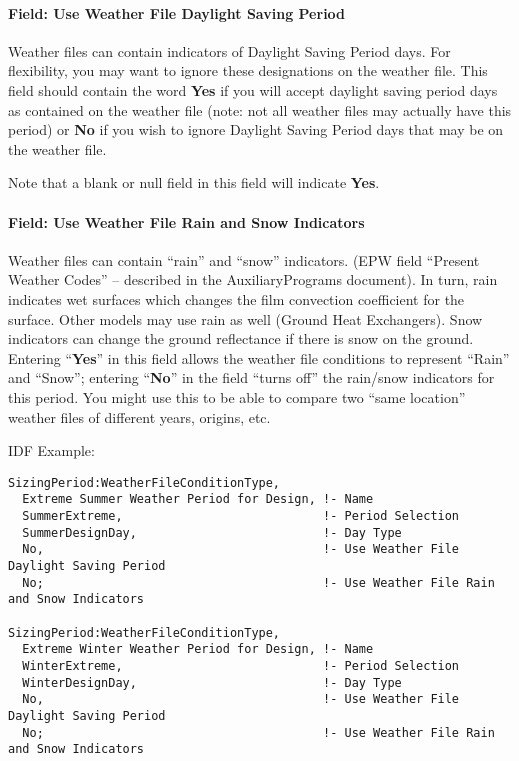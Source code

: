 \paragraph{Field: Use Weather File Daylight Saving Period}\label{field-use-weather-file-daylight-saving-period-1}

Weather files can contain indicators of Daylight Saving Period days. For flexibility, you may want to ignore these designations on the weather file. This field should contain the word \textbf{Yes} if you will accept daylight saving period days as contained on the weather file (note: not all weather files may actually have this period) or \textbf{No} if you wish to ignore Daylight Saving Period days that may be on the weather file.

Note that a blank or null field in this field will indicate \textbf{Yes}.

\paragraph{Field: Use Weather File Rain and Snow Indicators}\label{field-use-weather-file-rain-and-snow-indicators-1}

Weather files can contain ``rain'' and ``snow'' indicators. (EPW field ``Present Weather Codes'' -- described in the AuxiliaryPrograms document). In turn, rain indicates wet surfaces which changes the film convection coefficient for the surface. Other models may use rain as well (Ground Heat Exchangers). Snow indicators can change the ground reflectance if there is snow on the ground. Entering ``\textbf{Yes}'' in this field allows the weather file conditions to represent ``Rain'' and ``Snow''; entering ``\textbf{No}'' in the field ``turns off'' the rain/snow indicators for this period. You might use this to be able to compare two ``same location'' weather files of different years, origins, etc.

IDF Example:

\begin{lstlisting}
SizingPeriod:WeatherFileConditionType,
  Extreme Summer Weather Period for Design, !- Name
  SummerExtreme,                            !- Period Selection
  SummerDesignDay,                          !- Day Type
  No,                                       !- Use Weather File Daylight Saving Period
  No;                                       !- Use Weather File Rain and Snow Indicators

SizingPeriod:WeatherFileConditionType,
  Extreme Winter Weather Period for Design, !- Name
  WinterExtreme,                            !- Period Selection
  WinterDesignDay,                          !- Day Type
  No,                                       !- Use Weather File Daylight Saving Period
  No;                                       !- Use Weather File Rain and Snow Indicators
\end{lstlisting}

